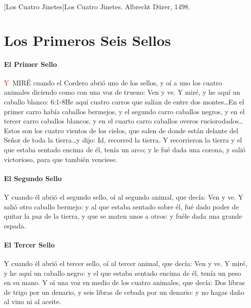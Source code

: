 [Los Cuatro Jinetes]{Los Cuatro Jinetes. Albrecht Dürer, 1498.}

\chapter{Los Primeros Seis Sellos}
\subsubsection*{El Primer Sello}
\lettrine[lines=3]{\textcolor{red}{Y}}{\ MIRÉ} cuando el Cordero abrió uno de los sellos, y oí a uno los cuatro animales diciendo como con una voz de trueno: Ven y ve. 
Y miré, y he aquí un caballo blanco:%
					{6:1-8}{He aquí cuatro carros que salían de entre dos montes\ldots En el primer carro había caballos bermejos, y el segundo carro caballos negros, y en el tercer carro caballos blancos, y en el cuarto carro caballos overos ruciorodados\ldots Estos son los cuatro vientos de los cielos, que salen de donde están delante del Señor de toda la tierra\ldots y dijo: Id, recorred la tierra. Y recorrieron la tierra}
 y el que estaba sentado encima de él, tenía un arco; y le fué dada una corona, y salió victorioso, para que también venciese.
\subsubsection*{El Segundo Sello}
Y cuando él abrió el segundo sello, oí al segundo animal, que decía: Ven y ve. %
Y salió otro caballo bermejo: y al que estaba sentado sobre él, fué dado poder de quitar la paz de la tierra, y que se maten unos a otros: y fuéle dada una grande espada.
\subsubsection*{El Tercer Sello}
Y cuando él abrió el tercer sello, oí al tercer animal, que decía: Ven y ve. Y miré, y he aquí un caballo negro: y el que estaba sentado encima de él, tenía un peso en su mano. %
Y oí una voz en medio de los cuatro animales, que decía: Dos libras de trigo por un denario, y seis libras de cebada por un denario: y no hagas daño al vino ni al aceite.

